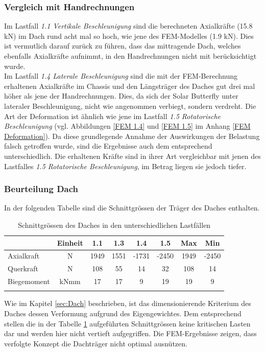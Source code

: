 \subsubsection{Vergleich mit Handrechnungen}
Im Lastfall \emph{1.1 Vertikale Beschleunigung} sind die berechneten Axialkräfte (15.8 kN) im Dach rund acht mal so hoch, wie jene des FEM-Modelles (1.9 kN). Dies ist vermutlich darauf zurück zu führen, dass das mittragende Dach, welches ebenfalls Axialkräfte aufnimmt, in den Handrechnungen nicht mit berücksichtigt wurde.\\
Im Lastfall \emph{1.4 Laterale Beschleunigung} sind die mit der FEM-Berechnung erhaltenen Axialkräfte im Chassis und den Längsträger des Daches gut drei mal höher als jene der Handrechnungen. Dies, da sich der Solar Butterfly unter lateraler Beschleunigung, nicht wie angenommen verbiegt, sondern verdreht. Die Art der Deformation ist ähnlich wie jene im Lastfall \emph{1.5 Rotatorische Beschleunigung} (vgl. Abbildungen \ref{FEM 1.4} und \ref{FEM 1.5} im Anhang \ref{FEM Deformation}). Da diese grundlegende Annahme der Auswirkungen der Belastung falsch getroffen wurde, sind die Ergebnisse auch dem entsprechend unterschiedlich. Die erhaltenen Kräfte sind in ihrer Art vergleichbar mit jenen des Lastfalles \emph{1.5 Rotatorische Beschleunigung}, im Betrag liegen sie jedoch tiefer.\\

\subsubsection{Beurteilung Dach}
In der folgenden Tabelle sind die Schnittgrössen der Träger des Daches enthalten.

\begin{table}[H]
\centering
\begin{tabular}{lccccccc}
\thickhline
  &	Einheit	&	1.1	&	1.3	&	1.4	&	1.5	&	Max	&	Min	\\	\hline
Axialkraft	&	N	&	1949	&	1551	&	-1731	&	-2450	&	1949	&	-2450	\\
Querkraft	&	N	&	108	&	55	&	14	&	32	&	108	&	14	\\
Biegemoment	&	kNmm	&	17	&	17	&	9	&	19	&	19	&	9	\\	\thickhline
\end{tabular}
\caption{Schnittgrössen des Daches in den unterschiedlichen Lastfällen}
\label{tab:FEMres Dach}
\end{table}


Wie im Kapitel \ref{sec:Dach} beschrieben, ist das dimensionierende Kriterium des Daches dessen Verformung aufgrund des Eigengewichtes. Dem entsprechend stellen die in der Tabelle \ref{tab:FEMres Dach} aufgeführten Schnittgrössen keine kritischen Lasten dar und werden hier nicht vertieft aufgegriffen. Die FEM-Ergebnisse zeigen, dass verfolgte Konzept die Dachträger nicht optimal ausnützen.

